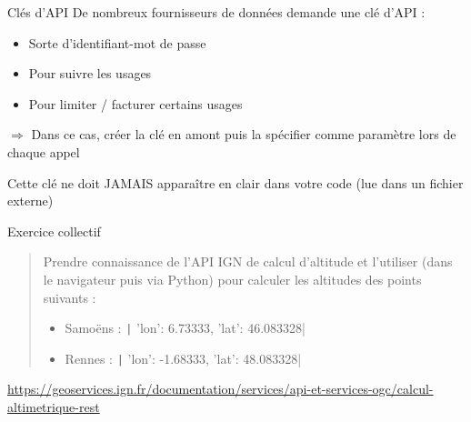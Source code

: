 \documentclass[10pt]{beamer}
\begin{document}
\begin{frame}{Clés d'API}
  De nombreux fournisseurs de données demande une clé d'API :
  \begin{itemize}
    \item Sorte d'identifiant-mot de passe
    \item Pour suivre les usages
    \item Pour limiter / facturer certains usages
  \end{itemize}

  $\Rightarrow$ Dans ce cas, créer la clé en amont puis la spécifier comme paramètre lors de chaque appel

  \pause

  \alert{Cette clé ne doit JAMAIS apparaître en clair dans votre code (lue dans un fichier externe)}

\end{frame}


\begin{frame}{Exercice collectif}
  \begin{quote}
    Prendre connaissance de l'API IGN de calcul d'altitude et l'utiliser (dans le navigateur puis via Python) pour calculer les altitudes des points suivants :
    \begin{itemize}
      \item Samoëns : \texttt| {'lon': 6.73333, 'lat': 46.083328}|
      \item Rennes : \texttt| {'lon': -1.68333, 'lat': 48.083328}|
    \end{itemize}
  \end{quote}

  {\centering
    \url{https://geoservices.ign.fr/documentation/services/api-et-services-ogc/calcul-altimetrique-rest}
  }

\end{frame}
\end{document}
